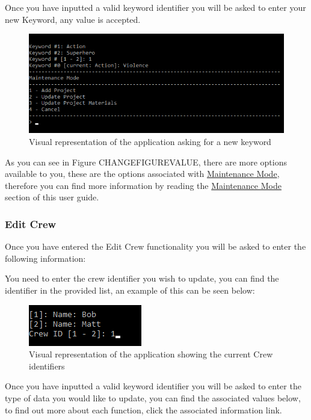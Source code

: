 \documentclass[
  english,
  a4paper,
,tablecaptionabove
]{scrartcl}
\begin{document}
Once you have inputted a valid keyword identifier you will be asked to
enter your new Keyword, any value is accepted.

\begin{figure}
\centering
\includegraphics{images/user-guide/maintenance-mode/update-project-keyword.png}
\caption{Visual representation of the application asking for a new
keyword}
\end{figure}

As you can see in Figure CHANGEFIGUREVALUE, there are more options
available to you, these are the options associated with
\protect\hyperlink{using-maintenance-mode}{Maintenance Mode}, therefore
you can find more information by reading the
\protect\hyperlink{using-maintenance-mode}{Maintenance Mode} section of
this user guide.

\newpage

\hypertarget{edit-crew-1}{%
\subsubsection{Edit Crew}\label{edit-crew-1}}

Once you have entered the Edit Crew functionality you will be asked to
enter the following information:

You need to enter the crew identifier you wish to update, you can find
the identifier in the provided list, an example of this can be seen
below:

\begin{figure}
\centering
\includegraphics{images/user-guide/maintenance-mode/update-project-select-crew.png}
\caption{Visual representation of the application showing the current
Crew identifiers}
\end{figure}

Once you have inputted a valid keyword identifier you will be asked to
enter the type of data you would like to update, you can find the
associated values below, to find out more about each function, click the
associated information link.
\end{document}
